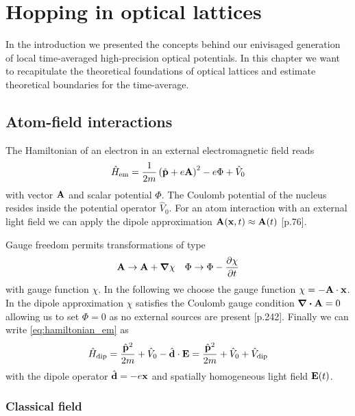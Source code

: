 \chapter{Hopping in optical lattices}

In the introduction we presented the concepts behind our enivisaged
generation of local time-averaged high-precision optical potentials. In this
chapter we want to recapitulate the theoretical foundations of optical
lattices and estimate theoretical boundaries for the time-average.

\section{Atom-field interactions}

The Hamiltonian of an electron in an external electromagnetic field reads
\begin{equation}
  \hat{H}_\text{em}
  =\frac{1}{2m}\left(\hat{\vb{p}}+e\vb{A}\right)^2-e\Phi+\hat{V}_0
  \label{eq:hamiltonian_em}
\end{equation}
with vector $\vb{A}$ and scalar potential $\Phi$. The Coulomb potential of
the nucleus resides inside the potential operator $\hat{V}_0$. For an atom
interaction with an external light field we can apply the dipole approximation
$\vb{A}(\vb{x},t)\approx\vb{A}(t)$ \cite{Gerry2004}[p.76].

Gauge freedom permits transformations of type
\begin{align}
  \vb{A}\to\vb{A}+\grad{\chi}
  &&
  \Phi\to\Phi-\pdv{\chi}{t}
\end{align}
with gauge function $\chi$. In the following we choose the gauge function
$\chi=-\vb{A}\cdot\vb{x}$. In the dipole approximation $\chi$ satisfies the
Coulomb gauge condition $\divergence{\vb{A}}=0$ allowing us to set $\Phi=0$
as no external sources are present \cite{Jackson2005}[p.242]. Finally we can
write \cref{eq:hamiltonian_em} as
\begin{equation}
  \hat{H}_\text{dip}
  =\frac{\hat{\vb{p}}^2}{2m}+\hat{V}_0-\hat{\vb{d}}\cdot\vb{E}
  =\frac{\hat{\vb{p}}^2}{2m}+\hat{V}_0+\hat{V}_\text{dip}
  \label{eq:hamiltonian_dip}
\end{equation}
with the dipole operator $\hat{\vb{d}}=-e\vb{x}$ and spatially homogeneous
light field $\vb{E}(t)$.

\subsection{Classical field}

